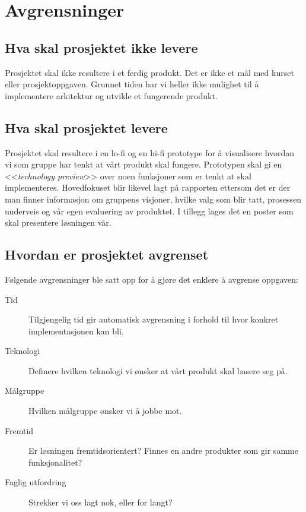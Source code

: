 \section{Avgrensninger} \label{sec:avgrensninger}

\subsection{Hva skal prosjektet ikke levere}
Prosjektet skal ikke resultere i et ferdig produkt. Det er ikke et mål med kurset eller prosjektoppgaven. Grunnet tiden har vi heller ikke mulighet til å implementere arkitektur og utvikle et fungerende produkt.

\subsection{Hva skal prosjektet levere}
Prosjektet skal resultere i en lo-fi og en hi-fi prototype for å visualisere hvordan vi som gruppe har tenkt at vårt produkt skal fungere. Prototypen skal gi en <<\textit{technology preview}>> over noen funksjoner som er tenkt at skal implementeres.
Hovedfokuset blir likevel lagt på rapporten ettersom det er der man finner informasjon om gruppens visjoner, hvilke valg som blir tatt, prosessen underveis og vår egen evaluering av produktet. I tillegg lages det en poster som skal presentere løsningen vår.

\subsection{Hvordan er prosjektet avgrenset}
Følgende avgrensninger ble satt opp for å gjøre det enklere å avgrense oppgaven:
\begin{description}
\item[Tid] Tilgjengelig tid gir automatisk avgrensning i forhold til hvor konkret implementasjonen kan bli.
\item[Teknologi] Definere hvilken teknologi vi ønsker at vårt produkt skal basere seg på.
\item[Målgruppe] Hvilken målgruppe ønsker vi å jobbe mot.
\item[Fremtid] Er løsningen fremtidsorientert? Finnes en andre produkter som gir samme funksjonalitet?
\item[Faglig utfordring] Strekker vi oss lagt nok, eller for langt?

\end{description}

